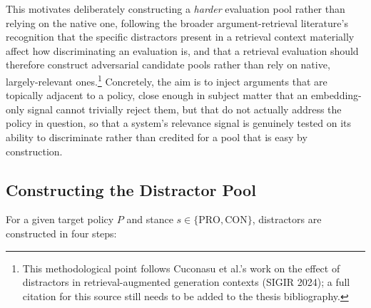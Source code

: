 This motivates deliberately constructing a \emph{harder} evaluation pool rather than relying on
the native one, following the broader argument-retrieval literature's recognition that the
specific distractors present in a retrieval context materially affect how discriminating an
evaluation is, and that a retrieval evaluation should therefore construct adversarial candidate
pools rather than rely on native, largely-relevant ones.\footnote{This methodological point
follows Cuconasu et al.'s work on the effect of distractors in retrieval-augmented generation
contexts (SIGIR 2024); a full citation for this source still needs to be added to the thesis
bibliography.} Concretely, the aim is to inject arguments that are topically adjacent to a
policy, close enough in subject matter that an embedding-only signal cannot trivially reject them,
but that do not actually address the policy in question, so that a system's relevance signal is
genuinely tested on its ability to discriminate rather than credited for a pool that is easy by
construction.

\subsection{Constructing the Distractor Pool}
\label{sec:methodology-hardened-pipeline}

For a given target policy $P$ and stance $s \in \{\text{PRO}, \text{CON}\}$, distractors are
constructed in four steps:

